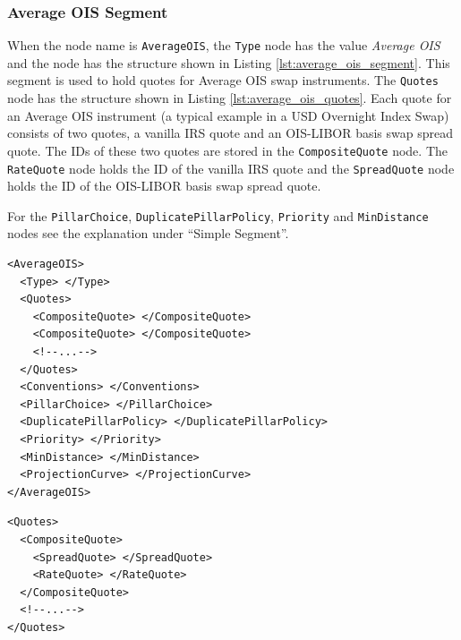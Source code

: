 \subsubsection*{Average OIS Segment}
When the node name is \lstinline!AverageOIS!, the \lstinline!Type! node has the value \emph{Average OIS} and the node
has the structure shown in Listing \ref{lst:average_ois_segment}. This segment is used to hold quotes for Average OIS
swap instruments. The \lstinline!Quotes! node has the structure shown in Listing \ref{lst:average_ois_quotes}. Each
quote for an Average OIS instrument (a typical example in a USD Overnight Index Swap) consists of two quotes, a vanilla
IRS quote and an OIS-LIBOR basis swap spread quote.  The IDs of these two quotes are stored in the
\lstinline!CompositeQuote! node. The \lstinline!RateQuote! node holds the ID of the vanilla IRS quote and the
\lstinline!SpreadQuote! node holds the ID of the OIS-LIBOR basis swap spread quote.

For the \lstinline!PillarChoice!, \lstinline!DuplicatePillarPolicy!, \lstinline!Priority! and \lstinline!MinDistance!
nodes see the explanation under ``Simple Segment''.

\begin{listing}[H]
\begin{verbatim}
<AverageOIS>
  <Type> </Type>
  <Quotes>
    <CompositeQuote> </CompositeQuote>
    <CompositeQuote> </CompositeQuote>
    <!--...-->
  </Quotes>
  <Conventions> </Conventions>
  <PillarChoice> </PillarChoice>
  <DuplicatePillarPolicy> </DuplicatePillarPolicy>
  <Priority> </Priority>
  <MinDistance> </MinDistance>
  <ProjectionCurve> </ProjectionCurve>
</AverageOIS>
\end{verbatim}
\caption{Average OIS yield curve segment}
\label{lst:average_ois_segment}
\end{listing}

\begin{listing}[H]
\begin{verbatim}
<Quotes>
  <CompositeQuote>
    <SpreadQuote> </SpreadQuote>
    <RateQuote> </RateQuote>
  </CompositeQuote>
  <!--...-->
</Quotes>
\end{verbatim}
\caption{Average OIS segment's quotes section}
\label{lst:average_ois_quotes}
\end{listing}

